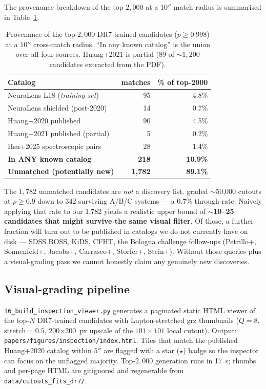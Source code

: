 \documentclass[11pt,letterpaper]{article}
\begin{document}
The provenance breakdown of the top $2{,}000$ at a $10''$ match radius
is summarised in Table~\ref{tab:provenance}.

\begin{table}[ht]
\centering
\caption{Provenance of the top-$2{,}000$ DR7-trained candidates
($p \geq 0.998$) at a $10''$ cross-match radius. ``In any known
catalog'' is the union over all four sources. Huang+2021 is partial
(89 of $\sim 1{,}200$ candidates extracted from the PDF).}
\label{tab:provenance}
\begin{tabular}{lrr}
\toprule
Catalog & matches & \% of top-2000 \\
\midrule
NeuraLens L18 (\emph{training set}) & 95 & 4.8\% \\
NeuraLens shielded (post-2020)      & 14 & 0.7\% \\
Huang+2020 published                & 90 & 4.5\% \\
Huang+2021 published (partial)      & 5  & 0.2\% \\
Hsu+2025 spectroscopic pairs        & 28 & 1.4\% \\
\midrule
\textbf{In ANY known catalog}       & \textbf{218} & \textbf{10.9\%} \\
\textbf{Unmatched (potentially new)}& \textbf{1{,}782} & \textbf{89.1\%} \\
\bottomrule
\end{tabular}
\end{table}

The $1{,}782$ unmatched candidates are \emph{not} a discovery list.
\textcite{huang2020decals} graded $\sim$50{,}000 cutouts at
$p \geq 0.9$ down to $342$ surviving A/B/C systems — a $0.7\%$
through-rate. Naively applying that rate to our 1{,}782 yields a
realistic upper bound of \textbf{$\sim$10--25 candidates that might
survive the same visual filter}. Of those, a further fraction will
turn out to be published in catalogs we do not currently have on disk
— SDSS BOSS, KiDS, CFHT, the Bologna challenge follow-ups
(Petrillo+, Sonnenfeld+, Jacobs+, Carrasco+, Storfer+, Stein+).
Without those queries plus a visual-grading pass we cannot honestly
claim any genuinely new discoveries.

\subsection{Visual-grading pipeline}

\texttt{16\_build\_inspection\_viewer.py} generates a paginated static
HTML viewer of the top-$N$ DR7-trained candidates with Lupton-stretched
grz thumbnails ($Q = 8$, $\mathrm{stretch} = 0.5$, 200$\times$200~px
upscale of the $101\times 101$ local cutout). Output:
\verb|papers/figures/inspection/index.html|. Tiles
that match the published Huang+2020 catalog within $5''$ are flagged
with a star ($\star$) badge so the inspector can focus on the unflagged
majority. Top-$2{,}000$ generation runs in 17~s; thumbs and per-page
HTML are gitignored and regenerable from \texttt{data/cutouts\_fits\_dr7/}.
\end{document}
